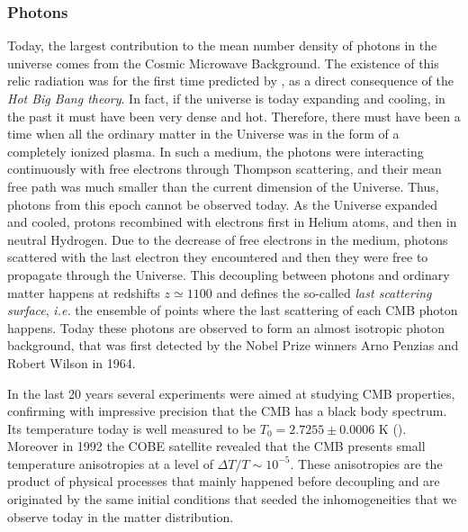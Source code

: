 \subsubsection{Photons}
Today, the largest contribution to the mean number density of photons in the universe comes from the Cosmic Microwave Background. The existence of this relic radiation was for the first time predicted by \citet{gamow}, as a direct consequence of the \emph{Hot Big Bang theory}. In fact, if the universe is today expanding and cooling, in the past it must have been very dense and hot. Therefore, there must have been a time when all the ordinary matter in the Universe was in the form of a completely ionized plasma. In such a medium, the photons were interacting continuously with free electrons through Thompson scattering, and their mean free path was much smaller than the current dimension of the Universe. Thus, photons from this epoch cannot be observed today. As the Universe expanded and cooled, protons recombined with electrons first in Helium atoms, and then in neutral Hydrogen. Due to the decrease of free electrons in the medium, photons scattered with the last electron they encountered and then they were free to propagate through the Universe. This decoupling between photons and ordinary matter happens at redshifts $z \simeq 1100$ and defines the so-called \emph{last scattering surface}, \emph{i.e.} the ensemble of points where the last scattering of each CMB photon happens. Today these photons
are observed to form an almost isotropic photon background, that was first detected by the Nobel Prize winners Arno Penzias and Robert Wilson in 1964.

In the last 20 years several experiments were aimed at studying CMB properties, confirming with impressive precision that the CMB has a black body spectrum. Its temperature today is well measured to be $T_0=2.7255 \pm 0.0006$ K (\citealt{Fixsen}). Moreover in 1992 the COBE satellite revealed that the CMB presents small temperature anisotropies at a level of $\Delta T /T \sim 10^{-5}$. These anisotropies are the product of physical processes that mainly happened before decoupling and are originated by the same initial conditions that seeded the inhomogeneities that we observe today in the matter distribution.


